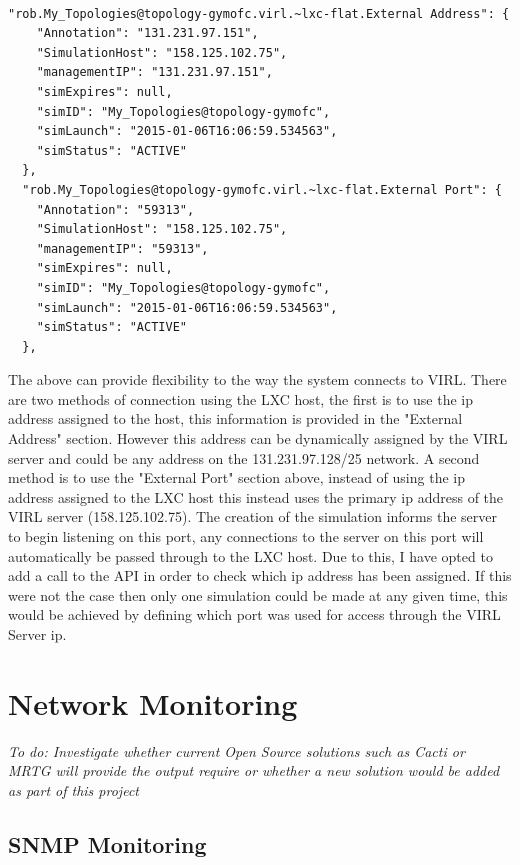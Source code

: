 \documentclass[11pt]{report}
\begin{document}
\begin{lstlisting}

"rob.My_Topologies@topology-gymofc.virl.~lxc-flat.External Address": {
    "Annotation": "131.231.97.151",
    "SimulationHost": "158.125.102.75",
    "managementIP": "131.231.97.151",
    "simExpires": null,
    "simID": "My_Topologies@topology-gymofc",
    "simLaunch": "2015-01-06T16:06:59.534563",
    "simStatus": "ACTIVE"
  },
  "rob.My_Topologies@topology-gymofc.virl.~lxc-flat.External Port": {
    "Annotation": "59313",
    "SimulationHost": "158.125.102.75",
    "managementIP": "59313",
    "simExpires": null,
    "simID": "My_Topologies@topology-gymofc",
    "simLaunch": "2015-01-06T16:06:59.534563",
    "simStatus": "ACTIVE"
  },

\end{lstlisting}

The above can provide flexibility to the way the system connects to VIRL. There are two methods of connection using the LXC host, the first is to use the ip address assigned to the host, this information is provided in the "External Address" section. However this address can be dynamically assigned by the VIRL server and could be any address on the 131.231.97.128/25 network. A second method is to use the "External Port" section above, instead of using the ip address assigned to the LXC host this instead uses the primary ip address of the VIRL server (158.125.102.75). The creation of the simulation informs the server to begin listening on this port, any connections to the server on this port will automatically be passed through to the LXC host. Due to this, I have opted to add a call to the API in order to check which ip address has been assigned. If this were not the case then only one simulation could be made at any given time, this would be achieved by defining which port was used for access through the VIRL Server ip.

\section{Network Monitoring}

\textit{To do: Investigate whether current Open Source solutions such as Cacti or MRTG will provide the output require or whether a new solution would be added as part of this project}

\subsection{SNMP Monitoring}
\end{document}
